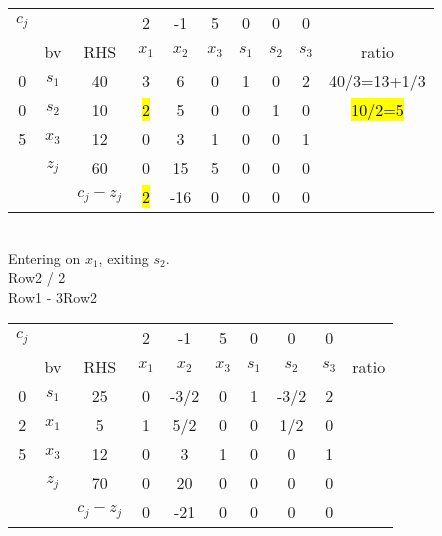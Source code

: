 \documentclass[answers]{exam}
\begin{document}
\begin{tabular}{cccccccccc}
	$c_j$                  &                            &                                & 2     & -1    & 5     & 0     & 0     & 0     &             \\
	\multicolumn{1}{c|}{}  & \multicolumn{1}{c|}{bv}    & \multicolumn{1}{c|}{RHS}       & $x_1$ & $x_2$ & $x_3$ & $s_1$ & $s_2$ & $s_3$ & ratio       \\ \cline{1-9}
	\multicolumn{1}{c|}{0} & \multicolumn{1}{c|}{$s_1$} & \multicolumn{1}{c|}{40}        & 3     & 6     & 0     & 1     & 0     & 2     & 40/3=13+1/3 \\
	\multicolumn{1}{c|}{0} & \multicolumn{1}{c|}{$s_2$} & \multicolumn{1}{c|}{10}        & \hl{2}     & 5     & 0     & 0     & 1     & 0     & \hl{10/2=5}      \\
	\multicolumn{1}{c|}{5} & \multicolumn{1}{c|}{$x_3$} & \multicolumn{1}{c|}{12}        & 0     & 3     & 1     & 0     & 0     & 1     &             \\ \cline{1-9}
	& \multicolumn{1}{c|}{$z_j$} & \multicolumn{1}{c|}{60}        & 0     & 15    & 5     & 0     & 0     & 0     &             \\ \cline{3-9}
	&                            & \multicolumn{1}{c|}{$c_j-z_j$} & \hl{2}     & -16   & 0     & 0     & 0     & 0     &            
\end{tabular}\\

\noindent
Entering on $x_1$, exiting $s_2$. \\
Row2 / 2 \\
Row1 - 3Row2 \\

\begin{tabular}{cccccccccc}
	$c_j$                  &                            &                                & 2     & -1    & 5     & 0     & 0     & 0     &       \\
	\multicolumn{1}{c|}{}  & \multicolumn{1}{c|}{bv}    & \multicolumn{1}{c|}{RHS}       & $x_1$ & $x_2$ & $x_3$ & $s_1$ & $s_2$ & $s_3$ & ratio \\ \cline{1-9}
	\multicolumn{1}{c|}{0} & \multicolumn{1}{c|}{$s_1$} & \multicolumn{1}{c|}{25}        & 0     & -3/2  & 0     & 1     & -3/2  & 2     &       \\
	\multicolumn{1}{c|}{2} & \multicolumn{1}{c|}{$x_1$} & \multicolumn{1}{c|}{5}         & 1     & 5/2   & 0     & 0     & 1/2   & 0     &       \\
	\multicolumn{1}{c|}{5} & \multicolumn{1}{c|}{$x_3$} & \multicolumn{1}{c|}{12}        & 0     & 3     & 1     & 0     & 0     & 1     &       \\ \cline{1-9}
	& \multicolumn{1}{c|}{$z_j$} & \multicolumn{1}{c|}{70}        & 0     & 20    & 0     & 0     & 0     & 0     &       \\ \cline{3-9}
	&                            & \multicolumn{1}{c|}{$c_j-z_j$} & 0     & -21   & 0     & 0     & 0     & 0     &      
\end{tabular}\\
\end{document}
